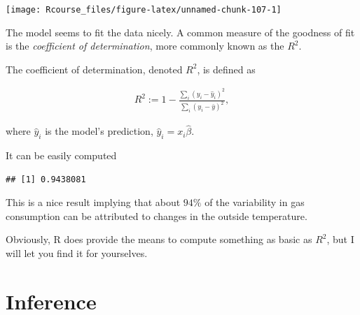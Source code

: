 \documentclass[]{book}
\newenvironment{Shaded}{\begin{snugshade}}{\end{snugshade}}
\newcommand{\KeywordTok}[1]{\textcolor[rgb]{0.13,0.29,0.53}{\textbf{#1}}}
\newcommand{\DataTypeTok}[1]{\textcolor[rgb]{0.13,0.29,0.53}{#1}}
\newcommand{\DecValTok}[1]{\textcolor[rgb]{0.00,0.00,0.81}{#1}}
\newcommand{\StringTok}[1]{\textcolor[rgb]{0.31,0.60,0.02}{#1}}
\newcommand{\ControlFlowTok}[1]{\textcolor[rgb]{0.13,0.29,0.53}{\textbf{#1}}}
\newcommand{\OperatorTok}[1]{\textcolor[rgb]{0.81,0.36,0.00}{\textbf{#1}}}
\newcommand{\NormalTok}[1]{#1}
\theoremstyle{definition}
\theoremstyle{definition}
\theoremstyle{definition}
\theoremstyle{remark}
\let\BeginKnitrBlock\begin \let\EndKnitrBlock\end
\begin{document}
\texttt{[image: Rcourse\_files/figure-latex/unnamed-chunk-107-1]}

The model seems to fit the data nicely. A common measure of the goodness
of fit is the \emph{coefficient of determination}, more commonly known
as the \(R^2\).



\BeginKnitrBlock{definition}[R2]
\protect\hypertarget{def:unnamed-chunk-108}{}{\label{def:unnamed-chunk-108}
{} }The coefficient of determination, denoted \(R^2\),
is defined as

\begin{align}
  R^2:= 1-\frac{\sum_i (y_i - \hat y_i)^2}{\sum_i (y_i - \bar y)^2},
\end{align}

where \(\hat y_i\) is the model's prediction,
\(\hat y_i = x_i \hat \beta\).
\EndKnitrBlock{definition}

It can be easily computed

\begin{Shaded}
\end{Shaded}

\begin{verbatim}
## [1] 0.9438081
\end{verbatim}

This is a nice result implying that about \(94\%\) of the variability in
gas consumption can be attributed to changes in the outside temperature.

Obviously, R does provide the means to compute something as basic as
\(R^2\), but I will let you find it for yourselves.

\section{Inference}\label{inference}
\end{document}
